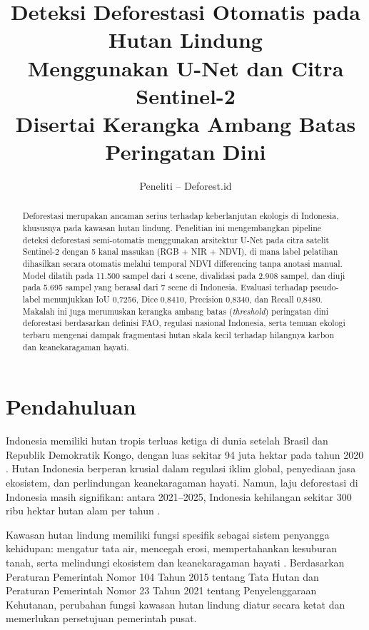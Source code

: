 \documentclass[12pt,a4paper]{article}
\title{\textbf{Deteksi Deforestasi Otomatis pada Hutan Lindung \\
Menggunakan U-Net dan Citra Sentinel-2} \\
\large Disertai Kerangka Ambang Batas Peringatan Dini}
\author{Peneliti -- Deforest.id}
\date{}
\begin{document}
\maketitle
\thispagestyle{empty}

\begin{abstract}
Deforestasi merupakan ancaman serius terhadap keberlanjutan ekologis di Indonesia,
khususnya pada kawasan hutan lindung. Penelitian ini mengembangkan pipeline deteksi
deforestasi semi-otomatis menggunakan arsitektur U-Net pada citra satelit Sentinel-2
dengan 5 kanal masukan (RGB + NIR + NDVI), di mana label pelatihan dihasilkan secara
otomatis melalui temporal NDVI differencing tanpa anotasi manual. Model dilatih pada
11.500 sampel dari 4 scene, divalidasi pada 2.908 sampel, dan diuji pada 5.695 sampel
yang berasal dari 7 scene di Indonesia. Evaluasi terhadap pseudo-label menunjukkan
IoU 0,7256, Dice 0,8410, Precision 0,8340, dan Recall 0,8480. Makalah ini juga
merumuskan kerangka ambang batas (\textit{threshold}) peringatan dini deforestasi
berdasarkan definisi FAO, regulasi nasional Indonesia, serta temuan ekologi terbaru
mengenai dampak fragmentasi hutan skala kecil terhadap hilangnya karbon dan
keanekaragaman hayati.
\end{abstract}

\section{Pendahuluan}
\label{sec:pendahuluan}

Indonesia memiliki hutan tropis terluas ketiga di dunia setelah Brasil dan
Republik Demokratik Kongo, dengan luas sekitar 94 juta hektar pada tahun 2020
\cite{fao2020fra}. Hutan Indonesia berperan krusial dalam regulasi iklim global,
penyediaan jasa ekosistem, dan perlindungan keanekaragaman hayati. Namun, laju
deforestasi di Indonesia masih signifikan: antara 2021--2025, Indonesia kehilangan
sekitar 300 ribu hektar hutan alam per tahun \cite{fao2022sofo}.

Kawasan hutan lindung memiliki fungsi spesifik sebagai sistem penyangga kehidupan:
mengatur tata air, mencegah erosi, mempertahankan kesuburan tanah, serta melindungi
ekosistem dan keanekaragaman hayati \cite{unfccc2022indonesia}. Berdasarkan
Peraturan Pemerintah Nomor 104 Tahun 2015 tentang Tata Hutan dan Peraturan
Pemerintah Nomor 23 Tahun 2021 tentang Penyelenggaraan Kehutanan, perubahan fungsi
kawasan hutan lindung diatur secara ketat dan memerlukan persetujuan pemerintah pusat.
\end{document}
